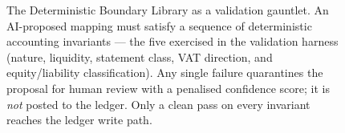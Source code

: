 \begin{figure}[p]
{%
}
\caption{The Deterministic Boundary Library as a validation gauntlet. An
AI-proposed mapping must satisfy a sequence of deterministic accounting
invariants --- the five exercised in the validation harness (nature, liquidity,
statement class, VAT direction, and equity/liability classification). Any single
failure quarantines the proposal for human review with a penalised confidence
score; it is \emph{not} posted to the ledger. Only a clean pass on every
invariant reaches the ledger write path.}
\label{fig:deterministic_checklist}
\end{figure}
